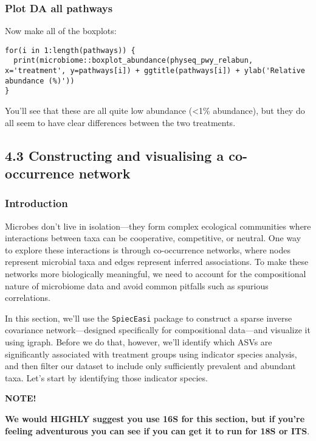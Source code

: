 \documentclass[
]{book}
\newenvironment{greenbox}{
  \definecolor{shadecolor}{RGB}{141, 181, 128}
  \color{white}
  \begin{shaded}}
 {\end{shaded}}
\begin{document}
\subsubsection{Plot DA all pathways}\label{plot-da-all-pathways}

Now make all of the boxplots:

\begin{verbatim}
for(i in 1:length(pathways)) {
  print(microbiome::boxplot_abundance(physeq_pwy_relabun, x='treatment', y=pathways[i]) + ggtitle(pathways[i]) + ylab('Relative abundance (%)'))
}
\end{verbatim}

You'll see that these are all quite low abundance (\textless1\% abundance), but they do all seem to have clear differences between the two treatments.

\subsection{4.3 Constructing and visualising a co-occurrence network}\label{constructing-and-visualising-a-co-occurrence-network}

\subsubsection{Introduction}\label{introduction-4}

Microbes don't live in isolation---they form complex ecological communities where interactions between taxa can be cooperative, competitive, or neutral. One way to explore these interactions is through co-occurrence networks, where nodes represent microbial taxa and edges represent inferred associations. To make these networks more biologically meaningful, we need to account for the compositional nature of microbiome data and avoid common pitfalls such as spurious correlations.

In this section, we'll use the \texttt{SpiecEasi} package to construct a sparse inverse covariance network---designed specifically for compositional data---and visualize it using igraph. Before we do that, however, we'll identify which ASVs are significantly associated with treatment groups using indicator species analysis, and then filter our dataset to include only sufficiently prevalent and abundant taxa. Let's start by identifying those indicator species.

\begin{greenbox}

\begin{center}
\textbf{NOTE!}

\end{center}

\textbf{We would HIGHLY suggest you use 16S for this section, but if you're feeling adventurous you can see if you can get it to run for 18S or ITS}.

\end{greenbox}
\end{document}
